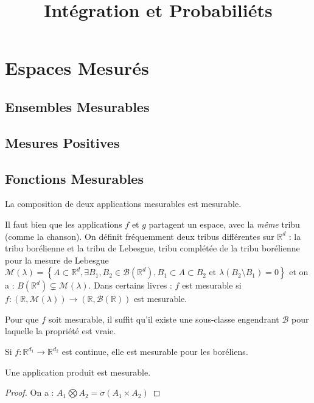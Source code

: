\documentclass{cours}
\title{Intégration et Probabiliéts}
\begin{document}
    \section{Espaces Mesurés}
    \subsection{Ensembles Mesurables}
    \subsection{Mesures Positives}
    \subsection{Fonctions Mesurables}
    \begin{theorem}
        La composition de deux applications mesurables est mesurable.
    \end{theorem}
    \begin{remark}
        Il faut bien que les applications $f$ et $g$ partagent un espace, avec la \emph{même} tribu (comme la chanson).
        On définit fréquemment deux tribus différentes sur $\mathbb{R}^{d}$ : la tribu borélienne et la tribu de Lebesgue, tribu complétée de la tribu borélienne pour la mesure de Lebesgue $\mathcal{M}(\lambda) = \left\{A \subset \mathbb{R}^{d}, \exists B_{1}, B_{2} \in \mathcal{B}(\mathbb{R}^{d}), B_1 \subset A \subset B_2 \text{ et } \lambda(B_2 \setminus B_1) = 0 \right\}$
        et on a : $B(\mathbb{R}^{d}) \subsetneq \mathcal{M}(\lambda)$. Dans certains livres : $f$ est mesurable si $f : \left(\mathbb{R}, \mathcal{M}(\lambda)\right) \rightarrow \left(\mathbb{R}, \mathcal{B}(\mathbb{R})\right)$ est mesurable.
    \end{remark}
    \begin{proposition}
        Pour que $f$ soit mesurable, il suffit qu'il existe une sous-classe engendrant $\mathcal{B}$ pour laquelle la propriété est vraie.
    \end{proposition}
    \begin{corollary}
        Si $f : \mathbb{R}^{d_1} \rightarrow\mathbb{R}^{d_2}$ est continue, elle est mesurable pour les boréliens.
    \end{corollary}
    \begin{corollary}
        Une application produit est mesurable.
    \end{corollary}
    \begin{proof}
        On a : $A_{1} \bigotimes A_{2} = \sigma\left(A_{1} \times A_{2}\right)$
    \end{proof}
\end{document}
